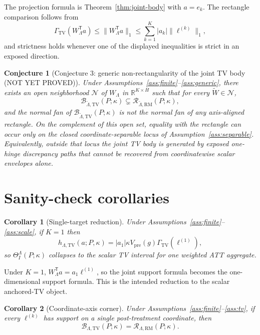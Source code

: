 \documentclass[11pt]{article}
\newcommand{\transpose}{\mathsf{T}}
\newcommand{\R}{\mathbb{R}}
\theoremstyle{definition}
\theoremstyle{plain}
\newtheorem{conjecture}{Conjecture}
\newtheorem{corollary}{Corollary}
\theoremstyle{remark}
\begin{document}
The projection formula is Theorem~\ref{thm:joint-body} with \(a=e_k\). The rectangle comparison follows from
\[
\Gamma_{\mathrm{TV}}(W_\Lambda^\transpose a)
\le
\|W_\Lambda^\transpose a\|_1
\le
\sum_{k=1}^K |a_k|\|\ell^{(k)}\|_1,
\]
and strictness holds whenever one of the displayed inequalities is strict in an exposed direction.

\begin{conjecture}[Conjecture 3: generic non-rectangularity of the joint TV body {\normalfont (NOT YET PROVED)}]\label{conj:generic-strict}
Under Assumptions~\ref{ass:finite}--\ref{ass:generic}, there exists an open neighborhood \(\mathcal N\) of \(W_\Lambda\) in \(\R^{K\times H}\) such that for every \(\widetilde W\in\mathcal N\),
\[
\mathcal B_{\widetilde\Lambda,\mathrm{TV}}(P;\kappa)
\subsetneq
\mathcal R_{\widetilde\Lambda,\mathrm{RM}}(P;\kappa),
\]
and the normal fan of \(\mathcal B_{\widetilde\Lambda,\mathrm{TV}}(P;\kappa)\) is not the normal fan of any axis-aligned rectangle. On the complement of this open set, equality with the rectangle can occur only on the closed coordinate-separable locus of Assumption~\ref{ass:separable}. Equivalently, outside that locus the joint TV body is generated by exposed one-hinge discrepancy paths that cannot be recovered from coordinatewise scalar envelopes alone.
\end{conjecture}

\section{Sanity-check corollaries}
\begin{corollary}[Single-target reduction]\label{cor:single}
Under Assumptions~\ref{ass:finite}--\ref{ass:scale}, if \(K=1\) then
\[
h_{\Lambda,\mathrm{TV}}(a;P,\kappa)
=
|a_1|\kappa V_{\mathrm{pre}}(g)\Gamma_{\mathrm{TV}}(\ell^{(1)}),
\]
so \(\Theta_I^\Lambda(P;\kappa)\) collapses to the scalar TV interval for one weighted ATT aggregate.
\end{corollary}

Under \(K=1\), \(W_\Lambda^\transpose a=a_1\ell^{(1)}\), so the joint support formula becomes the one-dimensional support formula. This is the intended reduction to the scalar anchored-TV object.

\begin{corollary}[Coordinate-axis corner]\label{cor:axis}
Under Assumptions~\ref{ass:finite}--\ref{ass:tv}, if every \(\ell^{(k)}\) has support on a single post-treatment coordinate, then
\[
\mathcal B_{\Lambda,\mathrm{TV}}(P;\kappa)=\mathcal R_{\Lambda,\mathrm{RM}}(P;\kappa).
\]
\end{corollary}
\end{document}
